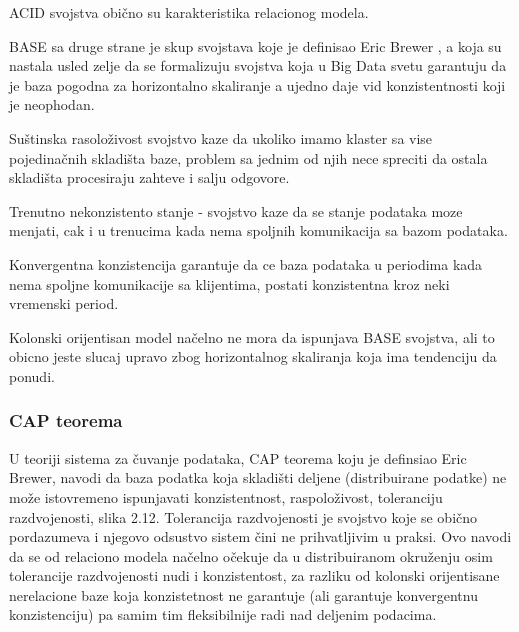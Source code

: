 \documentclass[12pt,oneside]{memoir}
\begin{document}
ACID svojstva obično su karakteristika relacionog modela.

BASE sa druge strane je skup svojstava koje je definisao Eric Brewer , a koja su nastala usled zelje da se formalizuju svojstva koja u Big Data svetu garantuju da je baza pogodna za horizontalno skaliranje a ujedno daje vid konzistentnosti koji je neophodan. 

Suštinska rasoloživost  svojstvo kaze da ukoliko imamo klaster sa vise pojedinačnih skladišta baze, problem sa jednim od njih nece spreciti da ostala skladišta procesiraju zahteve i salju odgovore.

Trenutno nekonzistento stanje -  svojstvo kaze da se stanje podataka moze menjati, cak i u trenucima kada nema spoljnih komunikacija sa bazom podataka.

Konvergentna konzistencija garantuje da ce baza podataka u periodima kada nema spoljne komunikacije sa klijentima, postati konzistentna kroz neki vremenski period. 

Kolonski orijentisan model načelno ne mora da ispunjava BASE svojstva, ali to obicno jeste slucaj upravo zbog horizontalnog skaliranja koja ima tendenciju da ponudi.

\subsubsection{CAP teorema}

U teoriji sistema za čuvanje podataka, CAP teorema koju je definsiao Eric Brewer, navodi da baza podatka koja skladišti deljene (distribuirane podatke) ne može istovremeno ispunjavati konzistentnost, raspoloživost, toleranciju razdvojenosti, slika 2.12.
Tolerancija razdvojenosti je svojstvo koje se obično pordazumeva i njegovo odsustvo sistem čini ne prihvatljivim u praksi. Ovo navodi da se od relaciono modela načelno očekuje da u distribuiranom okruženju osim tolerancije razdvojenosti nudi i konzistentost, za razliku od kolonski orijentisane nerelacione baze koja konzistetnost ne garantuje (ali garantuje konvergentnu konzistenciju) pa samim tim fleksibilnije radi nad deljenim podacima.
\end{document}
